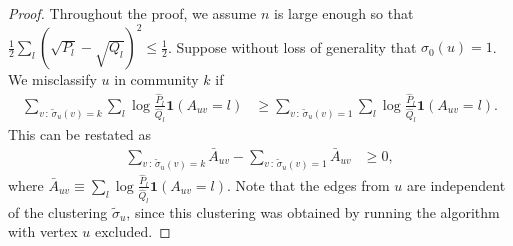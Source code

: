 \documentclass{article}
\begin{document}
\begin{proof}
Throughout the proof, we assume $n$ is large enough so that $\frac{1}{2} \sum_l (\sqrt{P_l} - \sqrt{Q_l})^2 \leq \frac{1}{2}$. Suppose without loss of generality that $\sigma_0(u) = 1$.  We misclassify $u$ in community $k$ if 
\begin{align}
\sum_{v\,:\, \tilde \sigma_u(v)=k} \sum_l \log \frac{\hat{P}_l}{\hat{Q}_l} \mathbf{1}(A_{uv} = l) 
&\geq 
 \sum_{v\,:\, \tilde \sigma_u(v)=1} \sum_l \log \frac{\hat{P}_l}{\hat{Q}_l} \mathbf{1}(A_{uv} = l).
\end{align}
This can be restated as
\begin{align}
\sum_{v \,:\, \tilde \sigma_u(v) = k} \bar{A}_{uv} - \sum_{v\,:\, \tilde \sigma_u(v) = 1} \bar{A}_{uv}
\label{eqn:bad_event1}
&\geq 0, 
\end{align}
where $\bar{A}_{uv} \equiv \sum_l \log \frac{\hat{P}_l}{\hat{Q}_l} \mathbf{1}(A_{uv} = l)$. Note that the edges from $u$ are independent of the clustering $\tilde \sigma_u$, since this clustering was obtained by running the algorithm with vertex $u$ excluded. 


\end{proof}
\end{document}
